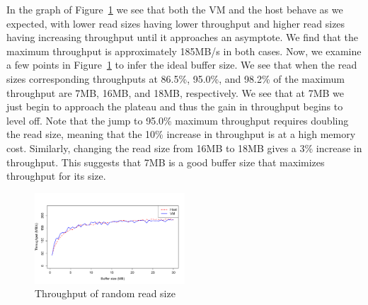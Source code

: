 In the graph of Figure~\ref{fig:p1graph} we see that both the VM and the host behave
as we expected, with lower read sizes having lower throughput and higher read sizes
having increasing throughput until it approaches an asymptote. We find that the 
maximum throughput is approximately 185MB/s in both cases. Now, we examine a few
points in Figure~\ref{fig:p1graph} to infer the ideal buffer size. We see that when 
the read sizes corresponding throughputs at 86.5\%, 95.0\%, and 98.2\% of the maximum 
throughput are 7MB, 16MB, and 18MB, respectively. We see that at 7MB we just begin to 
approach the plateau and thus the gain in throughput begins to level off.
Note that the jump to 95.0\% maximum throughput requires doubling the read size, 
meaning that the 10\% increase in throughput is at a high memory cost. Similarly, 
changing the read size from 16MB to 18MB gives a 3\% increase in throughput. This 
suggests that 7MB is a good buffer size that maximizes throughput for its size.

\begin{figure}[ht!]
	\includegraphics[width=0.5\textwidth]{./figures/p1.pdf}
	\caption{Throughput of random read size }
	\label{fig:p1graph}
\end{figure}


